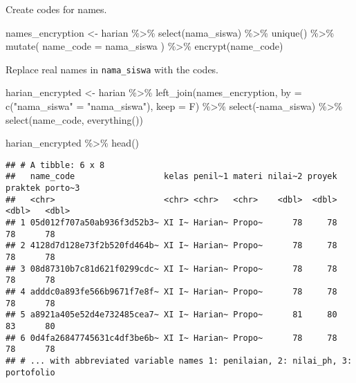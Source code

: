 \documentclass[
]{article}
\newenvironment{Shaded}{\begin{snugshade}}{\end{snugshade}}
\newcommand{\AttributeTok}[1]{\textcolor[rgb]{0.77,0.63,0.00}{#1}}
\newcommand{\FunctionTok}[1]{\textcolor[rgb]{0.00,0.00,0.00}{#1}}
\newcommand{\NormalTok}[1]{#1}
\newcommand{\OtherTok}[1]{\textcolor[rgb]{0.56,0.35,0.01}{#1}}
\newcommand{\SpecialCharTok}[1]{\textcolor[rgb]{0.00,0.00,0.00}{#1}}
\newcommand{\StringTok}[1]{\textcolor[rgb]{0.31,0.60,0.02}{#1}}
\begin{document}
Create codes for names.

\begin{Shaded}
\begin{Highlighting}[]
\NormalTok{names\_encryption }\OtherTok{\textless{}{-}} 
\NormalTok{  harian }\SpecialCharTok{\%\textgreater{}\%} 
  \FunctionTok{select}\NormalTok{(nama\_siswa) }\SpecialCharTok{\%\textgreater{}\%}
  \FunctionTok{unique}\NormalTok{() }\SpecialCharTok{\%\textgreater{}\%} 
  \FunctionTok{mutate}\NormalTok{(}
    \AttributeTok{name\_code =}\NormalTok{ nama\_siswa}
\NormalTok{  ) }\SpecialCharTok{\%\textgreater{}\%} 
  \FunctionTok{encrypt}\NormalTok{(name\_code)}
\end{Highlighting}
\end{Shaded}

Replace real names in \texttt{nama\_siswa} with the codes.

\begin{Shaded}
\begin{Highlighting}[]
\NormalTok{harian\_encrypted }\OtherTok{\textless{}{-}} 
\NormalTok{  harian }\SpecialCharTok{\%\textgreater{}\%} 
  \FunctionTok{left\_join}\NormalTok{(names\_encryption, }
            \AttributeTok{by =} \FunctionTok{c}\NormalTok{(}\StringTok{"nama\_siswa"} \OtherTok{=} \StringTok{"nama\_siswa"}\NormalTok{),}
            \AttributeTok{keep =}\NormalTok{ F) }\SpecialCharTok{\%\textgreater{}\%} 
  \FunctionTok{select}\NormalTok{(}\SpecialCharTok{{-}}\NormalTok{nama\_siswa) }\SpecialCharTok{\%\textgreater{}\%} 
  \FunctionTok{select}\NormalTok{(name\_code, }\FunctionTok{everything}\NormalTok{())}


\NormalTok{harian\_encrypted }\SpecialCharTok{\%\textgreater{}\%} \FunctionTok{head}\NormalTok{()}
\end{Highlighting}
\end{Shaded}

\begin{verbatim}
## # A tibble: 6 x 8
##   name_code                  kelas penil~1 materi nilai~2 proyek praktek porto~3
##   <chr>                      <chr> <chr>   <chr>    <dbl>  <dbl>   <dbl>   <dbl>
## 1 05d012f707a50ab936f3d52b3~ XI I~ Harian~ Propo~      78     78      78      78
## 2 4128d7d128e73f2b520fd464b~ XI I~ Harian~ Propo~      78     78      78      78
## 3 08d87310b7c81d621f0299cdc~ XI I~ Harian~ Propo~      78     78      78      78
## 4 adddc0a893fe566b9671f7e8f~ XI I~ Harian~ Propo~      78     78      78      78
## 5 a8921a405e52d4e732485cea7~ XI I~ Harian~ Propo~      81     80      83      80
## 6 0d4fa26847745631c4df3be6b~ XI I~ Harian~ Propo~      78     78      78      78
## # ... with abbreviated variable names 1: penilaian, 2: nilai_ph, 3: portofolio
\end{verbatim}
\end{document}
